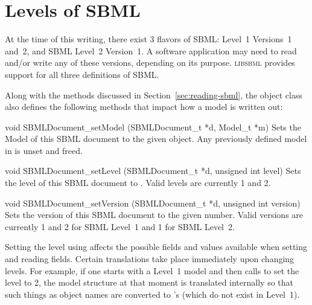 \documentclass{sbmlmanual}
\newcommand{\libsbml}{\textsc{libsbml}}
\begin{document}
\section{Levels of SBML}
\label{sec:sbml-levels}

At the time of this writing, there exist 3 flavors of SBML: Level~1
Versions~1 and~2, and SBML Level~2 Version~1.  A software application may
need to read and/or write any of these versions, depending on its purpose.
\libsbml{} provides support for all three definitions of SBML.

Along with the methods discussed in Section~\ref{sec:reading-sbml}, the
 object class also defines the following methods
that impact how a model is written out:


\begin{methoddef}{void SBMLDocument\_setModel (SBMLDocument\_t *d, Model\_t *m)}
  Sets the Model of this SBML document to the given  object.
  Any previously defined model in  is unset and freed.
\end{methoddef}


\begin{methoddef}{void SBMLDocument\_setLevel (SBMLDocument\_t *d, unsigned int level)}
  Sets the level of this SBML document to .  Valid levels
  are currently 1 and 2. 
\end{methoddef}


\begin{methoddef}{void SBMLDocument\_setVersion (SBMLDocument\_t *d, unsigned int version)}
  Sets the version of this SBML document to the given 
  number.  Valid versions are currently 1 and 2 for SBML Level~1 and 1 for SBML
  Level~2.
\end{methoddef}


Setting the level using  affects the
possible fields and values available when setting and reading fields.
Certain translations take place immediately upon changing levels.  For
example, if one starts with a Level~1 model and then calls
 to set the level to 2, the model
structure at that moment is translated internally so that such things as
object names are converted to 's (which do not exist in
Level~1).
\end{document}
